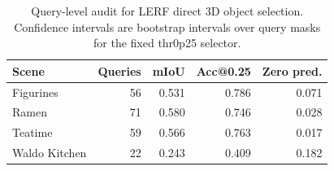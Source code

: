 \begin{table}[t]
  \centering
  \caption{Query-level audit for LERF direct 3D object selection. Confidence intervals are bootstrap intervals over query masks for the fixed thr0p25 selector.}
  \label{tab:direct3d_query_audit}
  \begin{tabular}{lrrrr}
    \toprule
    Scene & Queries & mIoU & Acc@0.25 & Zero pred. \\
    \midrule
    Figurines & 56 & 0.531 & 0.786 & 0.071 \\
    Ramen & 71 & 0.580 & 0.746 & 0.028 \\
    Teatime & 59 & 0.566 & 0.763 & 0.017 \\
    Waldo Kitchen & 22 & 0.243 & 0.409 & 0.182 \\
    \bottomrule
  \end{tabular}
\end{table}
